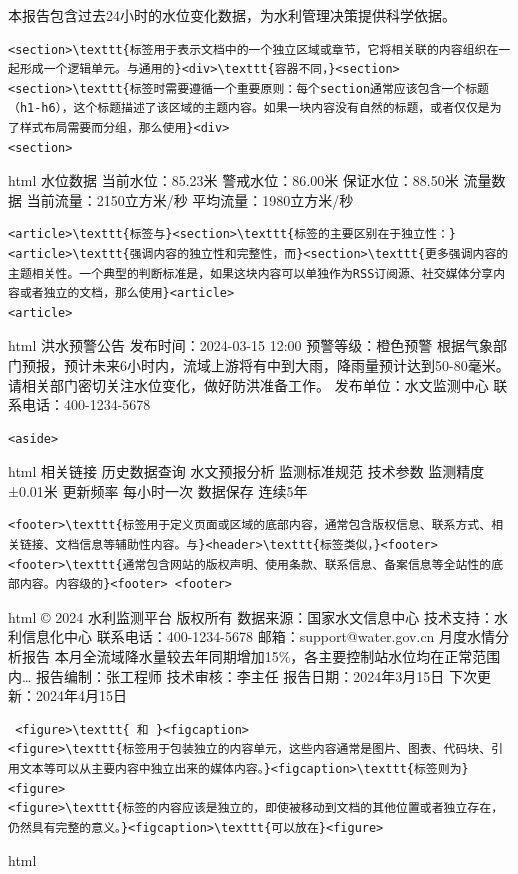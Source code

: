 本报告包含过去24小时的水位变化数据，为水利管理决策提供科学依据。 \begin{lstlisting}
<section>\texttt{标签用于表示文档中的一个独立区域或章节，它将相关联的内容组织在一起形成一个逻辑单元。与通用的}<div>\texttt{容器不同，}<section>
<section>\texttt{标签时需要遵循一个重要原则：每个section通常应该包含一个标题（h1-h6），这个标题描述了该区域的主题内容。如果一块内容没有自然的标题，或者仅仅是为了样式布局需要而分组，那么使用}<div>
<section> \end{lstlisting} html 水位数据 当前水位：85.23米 警戒水位：86.00米 保证水位：88.50米 流量数据 当前流量：2150立方米/秒 平均流量：1980立方米/秒
\begin{lstlisting}
<article>\texttt{标签与}<section>\texttt{标签的主要区别在于独立性：}<article>\texttt{强调内容的独立性和完整性，而}<section>\texttt{更多强调内容的主题相关性。一个典型的判断标准是，如果这块内容可以单独作为RSS订阅源、社交媒体分享内容或者独立的文档，那么使用}<article>
<article> \end{lstlisting} html 洪水预警公告 发布时间：2024-03-15 12:00 预警等级：橙色预警
根据气象部门预报，预计未来6小时内，流域上游将有中到大雨，降雨量预计达到50-80毫米。请相关部门密切关注水位变化，做好防洪准备工作。 发布单位：水文监测中心 联系电话：400-1234-5678 \begin{lstlisting}
<aside> \end{lstlisting} html 相关链接 历史数据查询 水文预报分析 监测标准规范 技术参数 监测精度 ±0.01米 更新频率 每小时一次 数据保存 连续5年 \begin{lstlisting}
<footer>\texttt{标签用于定义页面或区域的底部内容，通常包含版权信息、联系方式、相关链接、文档信息等辅助性内容。与}<header>\texttt{标签类似，}<footer>
<footer>\texttt{通常包含网站的版权声明、使用条款、联系信息、备案信息等全站性的底部内容。内容级的}<footer> <footer> \end{lstlisting} html © 2024 水利监测平台 版权所有
数据来源：国家水文信息中心 \textbar{} 技术支持：水利信息化中心 联系电话：400-1234-5678 \textbar{} 邮箱：support@water.gov.cn 月度水情分析报告
本月全流域降水量较去年同期增加15\%，各主要控制站水位均在正常范围内\ldots{} 报告编制：张工程师 \textbar{} 技术审核：李主任 报告日期：2024年3月15日 \textbar{} 下次更新：2024年4月15日
\begin{lstlisting} <figure>\texttt{ 和 }<figcaption>
<figure>\texttt{标签用于包装独立的内容单元，这些内容通常是图片、图表、代码块、引用文本等可以从主要内容中独立出来的媒体内容。}<figcaption>\texttt{标签则为}<figure>
<figure>\texttt{标签的内容应该是独立的，即使被移动到文档的其他位置或者独立存在，仍然具有完整的意义。}<figcaption>\texttt{可以放在}<figure> \end{lstlisting} html
